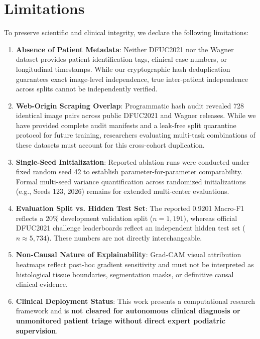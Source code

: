 \documentclass[journal]{IEEEtran}
\begin{document}
\section{Limitations}
To preserve scientific and clinical integrity, we declare the following limitations:
\begin{enumerate}
    \item \textbf{Absence of Patient Metadata}: Neither DFUC2021 nor the Wagner dataset provides patient identification tags, clinical case numbers, or longitudinal timestamps. While our cryptographic hash deduplication guarantees exact image-level independence, true inter-patient independence across splits cannot be independently verified.
    \item \textbf{Web-Origin Scraping Overlap}: Programmatic hash audit revealed 728 identical image pairs across public DFUC2021 and Wagner releases. While we have provided complete audit manifests and a leak-free split quarantine protocol for future training, researchers evaluating multi-task combinations of these datasets must account for this cross-cohort duplication.
    \item \textbf{Single-Seed Initialization}: Reported ablation runs were conducted under fixed random seed 42 to establish parameter-for-parameter comparability. Formal multi-seed variance quantification across randomized initializations (e.g., Seeds 123, 2026) remains for extended multi-center evaluations.
    \item \textbf{Evaluation Split vs. Hidden Test Set}: The reported 0.9201 Macro-F1 reflects a 20\% development validation split ($n = 1,191$), whereas official DFUC2021 challenge leaderboards reflect an independent hidden test set ($n \approx 5,734$). These numbers are not directly interchangeable.
    \item \textbf{Non-Causal Nature of Explainability}: Grad-CAM visual attribution heatmaps reflect post-hoc gradient sensitivity and must not be interpreted as histological tissue boundaries, segmentation masks, or definitive causal clinical evidence.
    \item \textbf{Clinical Deployment Status}: This work presents a computational research framework and is \textbf{not cleared for autonomous clinical diagnosis or unmonitored patient triage without direct expert podiatric supervision}.
\end{enumerate}

\end{document}
